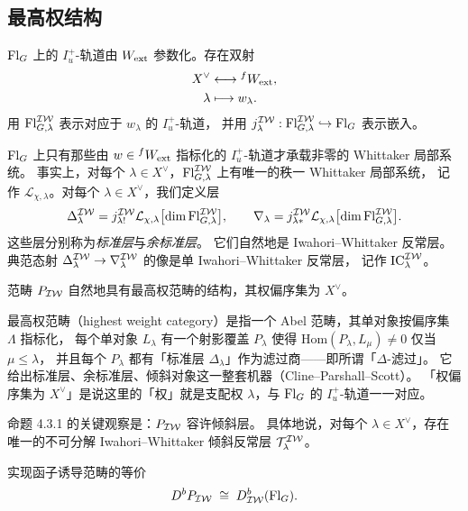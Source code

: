 \subsection{最高权结构}\label{sec:hw}

$\mathrm{Fl}_G$ 上的 $I^+_u$-轨道由 $W_{\mathrm{ext}}$ 参数化。存在双射
\begin{align*}
X^\vee&\longleftrightarrow {}^{f}W_{\mathrm{ext}},\\
\lambda&\longmapsto w_\lambda .
\end{align*}
用 $\mathrm{Fl}^{\mathcal{IW}}_{G,\lambda}$ 表示对应于 $w_\lambda$ 的 $I^+_u$-轨道，
并用 $j^{\mathcal{IW}}_\lambda:\mathrm{Fl}^{\mathcal{IW}}_{G,\lambda}\hookrightarrow\mathrm{Fl}_G$ 表示嵌入。

$\mathrm{Fl}_G$ 上只有那些由 $w\in{}^{f}W_{\mathrm{ext}}$ 指标化的 $I^+_u$-轨道才承载非零的 Whittaker 局部系统。
事实上，对每个 $\lambda\in X^\vee$，$\mathrm{Fl}^{\mathcal{IW}}_{G,\lambda}$ 上有唯一的秩一 Whittaker 局部系统，
记作 $\mathcal{L}_{\chi,\lambda}$。对每个 $\lambda\in X^\vee$，我们定义层
\[
\Delta^{\mathcal{IW}}_\lambda=j^{\mathcal{IW}}_{\lambda!}\mathcal{L}_{\chi,\lambda}\bigl[\dim\mathrm{Fl}^{\mathcal{IW}}_{G,\lambda}\bigr],
\qquad
\nabla_\lambda=j^{\mathcal{IW}}_{\lambda*}\mathcal{L}_{\chi,\lambda}\bigl[\dim\mathrm{Fl}^{\mathcal{IW}}_{G,\lambda}\bigr].
\]
这些层分别称为\emph{标准层}与\emph{余标准层}。
它们自然地是 Iwahori–Whittaker 反常层。
典范态射 $\Delta^{\mathcal{IW}}_\lambda\to\nabla^{\mathcal{IW}}_\lambda$ 的像是单 Iwahori–Whittaker 反常层，
记作 $\mathrm{IC}^{\mathcal{IW}}_\lambda$。

\begin{proposition}\label{prop:hw}
范畴 $P_{\mathcal{IW}}$ 自然地具有最高权范畴的结构，其权偏序集为 $X^\vee$。
\end{proposition}

\begin{yizhu}
最高权范畴（highest weight category）是指一个 Abel 范畴，其单对象按偏序集 $\Lambda$ 指标化，
每个单对象 $L_\lambda$ 有一个射影覆盖 $P_\lambda$ 使得 $\mathrm{Hom}(P_\lambda,L_\mu)\neq0$ 仅当 $\mu\le\lambda$，
并且每个 $P_\lambda$ 都有「标准层 $\Delta_\lambda$」作为滤过商——即所谓「$\Delta$-滤过」。
它给出标准层、余标准层、倾斜对象这一整套机器（Cline–Parshall–Scott）。
「权偏序集为 $X^\vee$」是说这里的「权」就是支配权 $\lambda$，与 $\mathrm{Fl}_G$ 的 $I^+_u$-轨道一一对应。
\end{yizhu}

命题 4.3.1 的关键观察是：$P_{\mathcal{IW}}$ 容许倾斜层。
具体地说，对每个 $\lambda\in X^\vee$，存在唯一的不可分解 Iwahori–Whittaker 倾斜反常层
$\mathcal{T}^{\mathcal{IW}}_\lambda$。

\begin{corollary}\label{cor:realiz}
实现函子诱导范畴的等价
\[
D^bP_{\mathcal{IW}}\;\cong\;D^b_{\mathcal{IW}}(\mathrm{Fl}_G).
\]
\end{corollary}

